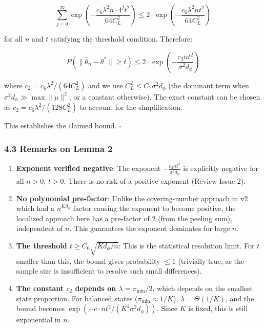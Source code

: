 \documentclass[
  12pt,
]{ctexart}
\begin{document}
\[\sum_{j=0}^\infty \exp\left(-\frac{c_6 \lambda^2 n \cdot 4^j t^2}{64 C_L^2}\right) \leq 2 \cdot \exp\left(-\frac{c_6 \lambda^2 n t^2}{64 C_L^2}\right)\]

for all \(n\) and \(t\) satisfying the threshold condition. Therefore:

\[P(\|\hat{\theta}_n - \theta^*\| \geq t) \leq 2 \cdot \exp\left(-\frac{c_2 n t^2}{\sigma^2 d_\phi}\right)\]

where \(c_2 = c_6 \lambda^2 / (64 C_L^2)\) and we use
\(C_L^2 \leq C_7 \sigma^2 d_\phi\) (the dominant term when
\(\sigma^2 d_\phi \gg \max\|\mu\|^2\), or a constant otherwise). The
exact constant can be chosen as \(c_2 = c_6 \lambda^2 / (128 C_L^2)\) to
account for the simplification.

This establishes the claimed bound. \(\square\)

\subsubsection{4.3 Remarks on Lemma 2}\label{remarks-on-lemma-2}

\begin{enumerate}
\def\labelenumi{\arabic{enumi}.}
\item
  \textbf{Exponent verified negative}: The exponent
  \(-\frac{c_2 n t^2}{\sigma^2 d_\phi}\) is explicitly negative for all
  \(n > 0\), \(t > 0\). There is no risk of a positive exponent (Review
  Issue 2).
\item
  \textbf{No polynomial pre-factor}: Unlike the covering-number approach
  in v2 which had a \(n^{K d_\phi}\) factor causing the exponent to
  become positive, the localized approach here has a pre-factor of \(2\)
  (from the peeling sum), independent of \(n\). This guarantees the
  exponent dominates for large \(n\).
\item
  \textbf{The threshold \(t \geq C_0 \sqrt{K d_\phi / n}\)}: This is the
  statistical resolution limit. For \(t\) smaller than this, the bound
  gives probability \(\leq 1\) (trivially true, as the sample size is
  insufficient to resolve such small differences).
\item
  \textbf{The constant \(c_2\) depends on \(\lambda = \pi_{\min}/2\)},
  which depends on the smallest state proportion. For balanced states
  (\(\pi_{\min} \approx 1/K\)), \(\lambda = \Theta(1/K)\), and the bound
  becomes \(\exp(-c \cdot n t^2 / (K^2 \sigma^2 d_\phi))\). Since \(K\)
  is fixed, this is still exponential in \(n\).
\end{enumerate}
\end{document}
